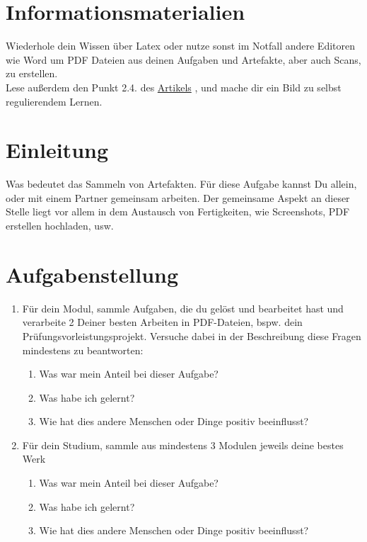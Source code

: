 \documentclass[a4paper,oneside]{scrarticle}
\begin{document}
	\pagebreak 
	
	\section*{Informationsmaterialien}
	
	Wiederhole dein Wissen über Latex oder nutze sonst im Notfall andere Editoren wie Word um PDF Dateien aus deinen Aufgaben und Artefakte, aber auch Scans, zu erstellen.\\
Lese außerdem den Punkt 2.4. des \href{10.1016/j.sbspro.2010.03.463}{Artikels} \cite{alexiou_enhancing_2010}, und mache dir ein Bild zu selbst regulierendem Lernen.
	
	
	
	
	\pagebreak
	
	\section*{Einleitung}
	Was bedeutet das Sammeln von Artefakten. Für diese Aufgabe kannst Du allein, oder mit einem Partner gemeinsam arbeiten. Der gemeinsame Aspekt an dieser Stelle liegt vor allem in dem Austausch von Fertigkeiten, wie Screenshots, PDF erstellen hochladen, usw.
	
	\section*{Aufgabenstellung}

	\begin{enumerate}
		\item Für dein Modul, sammle Aufgaben, die du gelöst und bearbeitet hast und verarbeite 2 Deiner besten Arbeiten in PDF-Dateien, bspw. dein Prüfungsvorleistungsprojekt. Versuche dabei in der Beschreibung diese Fragen mindestens zu beantworten:
		\begin{enumerate}
			\item Was war mein Anteil bei dieser Aufgabe?
			\item Was habe ich gelernt?
			\item Wie hat dies andere Menschen oder Dinge positiv beeinflusst?
		\end{enumerate}
		\item Für dein Studium, sammle aus mindestens 3 Modulen jeweils deine bestes Werk
		\begin{enumerate}
			\item Was war mein Anteil bei dieser Aufgabe?
			\item Was habe ich gelernt?
			\item Wie hat dies andere Menschen oder Dinge positiv beeinflusst?
		\end{enumerate}

	\end{enumerate}
\end{document}
